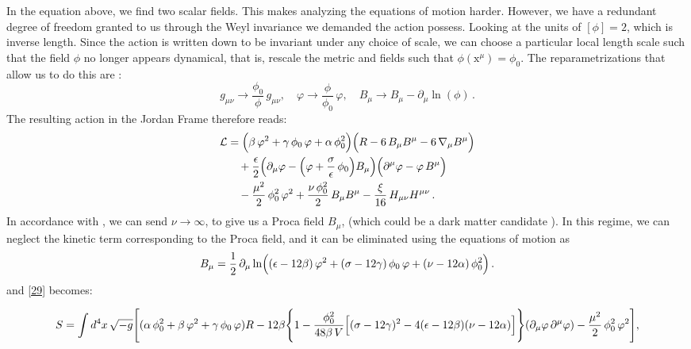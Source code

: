 \documentclass[aps,prd,reprint,preprintnumbers,showpacs,floatfix,nofootinbib,superscript address]{revtex4-2}
\begin{document}
In the equation above, we find two scalar fields. This makes analyzing the equations of motion harder. However, we have a redundant degree of freedom granted to us through the Weyl invariance we demanded the action possess. Looking at the units of $[\phi] = 2$, which is inverse length. Since the action is written down to be invariant under any choice of scale, we can choose a particular local length scale such that the field $\phi$ no longer appears dynamical, that is, rescale the metric and fields such that $\phi(\text{x}^\mu) = \phi_0$. The reparametrizations that allow us to do this are :
\[
g_{\mu \nu}\rightarrow\frac{\phi_0}{\phi}\,g_{\mu \nu},\quad 
\varphi\rightarrow\frac{\phi}{\phi_0}\,\varphi,\quad 
B_{\mu}\rightarrow B_{\mu} - \partial_{\mu}\ln(\phi)\,.
\] 
The resulting action in the Jordan Frame therefore reads:
\begin{equation}\label{29}
\begin{aligned}
\mathcal{L} &= \Bigl(\beta\, \varphi^2 + \gamma\, \phi_0\, \varphi + \alpha\, \phi_0^2\Bigr)
\Bigl(R - 6\, B_{\mu} B^{\mu} - 6\, \nabla_{\mu} B^\mu\Bigr) \\
&\quad + \frac{\epsilon}{2} \Bigl(\partial_{\mu}\varphi - \Bigl(\varphi + \frac{\sigma}{\epsilon}\,\phi_0\Bigr)B_{\mu}\Bigr)
\Bigl(\partial^{\mu}\varphi - \varphi\,B^{\mu}\Bigr) \\
&\quad - \frac{\mu^2}{2}\, \phi_0^2\,\varphi^2 
+ \frac{\nu\,\phi_0^2}{2}\,B_{\mu} B^{\mu} 
- \frac{\xi}{16}\,H_{\mu\nu} H^{\mu\nu}\,.
\end{aligned}
\end{equation}
In accordance with \cite{barker2024poincaregaugetheoryconformal}, we can send $\nu \rightarrow \infty$, to give us a Proca field $B_\mu$, (which could be a dark matter candidate \cite{Lasenby_2016}). In this regime, we can neglect the kinetic term corresponding to the Proca field, and it can be eliminated using the equations of motion as
\begin{equation}\label{30}
B_\mu = \frac{1}{2}\,\partial_\mu \ln\Bigl((\epsilon-12\beta)\,\varphi^2 + (\sigma-12\gamma)\,\phi_0\,\varphi + (\nu-12\alpha)\,\phi_0^2\Bigr)\,.
\end{equation}
and \ref{29} becomes:
\begin{widetext}
\begin{subequations}\label{33a}
\begin{align}
S = \int d^4x\, \sqrt{-g} \Biggl[ (\alpha\, \phi_0^2 + \beta\, \varphi^2 + \gamma\, \phi_0\,\varphi)R - 12\beta \Biggl\{1 - \frac{\phi_0^2}{48\beta\, V}\Bigl[(\sigma-12\gamma)^2 - 4(\epsilon-12\beta)(\nu-12\alpha)\Bigr]\Biggr\}
(\partial_{\mu}\varphi\, \partial^{\mu}\varphi) - \frac{\mu^2}{2}\,\phi_0^2\,\varphi^2 \Biggr],
\end{align}
\end{subequations}
\end{widetext}
\end{document}
